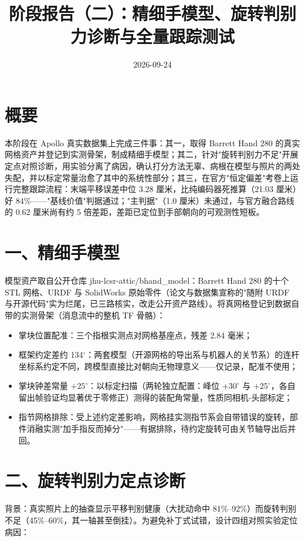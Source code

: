 \documentclass{article}
\title{阶段报告（二）：精细手模型、旋转判别力诊断与全量跟踪测试}
\author{}
\date{2026-09-24}
\begin{document}
\maketitle

\section{概要}
本阶段在 Apollo 真实数据集上完成三件事：其一，取得 Barrett Hand 280 的真实网格资产并登记到实测骨架，制成精细手模型；其二，针对"旋转判别力不足"开展定点对照诊断，用实验分离了病因，确认打分方法无辜、病根在模型与照片的两处失配，并以标定常量治愈了其中的系统性部分；其三，在官方"恒定偏差"考卷上运行完整跟踪流程：末端平移误差中位 3.28 厘米，比纯编码器死推算（21.03 厘米）好 84\%——"基线价值"判据通过；"主判据"（1.0 厘米）未通过，与官方融合路线的 0.62 厘米尚有约 5 倍差距，差距已定位到手部朝向的可观测性短板。

\section{一、精细手模型}
模型资产取自公开仓库 jhu-lcsr-attic/bhand\_model：Barrett Hand 280 的十个 STL 网格、URDF 与 SolidWorks 原始零件（论文与数据集宣称的"随附 URDF 与开源代码"实为烂尾，已三路核实，改走公开资产路线）。将真网格登记到数据自带的实测骨架（消息流中的整机 TF 骨骼）：

\begin{itemize}
\item 掌块位置配准：三个指根实测点对网格基座点，残差 2.84 毫米；
\item 框架约定差约 134$^\circ$：两套模型（开源网格的导出系与机器人的关节系）的连杆坐标系约定不同，跨模型直接比对朝向无物理意义——仅记录，配准不使用；
\item 掌块钟差常量 $+25^\circ$：以标定扫描（两轮独立配置：峰位 $+30^\circ$ 与 $+25^\circ$，各自留出帧验证均显著优于零修正）测得的装配角常量，性质同相机-头部标定；
\item 指节网格排除：受上述约定差影响，网格挂实测指节系会自带错误的旋转，部件消融实测"加手指反而掉分"——有据排除，待约定旋转可由关节轴导出后并回。
\end{itemize}

\section{二、旋转判别力定点诊断}
背景：真实照片上的抽查显示平移判别健康（大扰动命中 81\%--92\%）而旋转判别不足（45\%--60\%，其一轴甚至倒挂）。为避免补丁式试错，设计四组对照实验定位病因：
\end{document}
